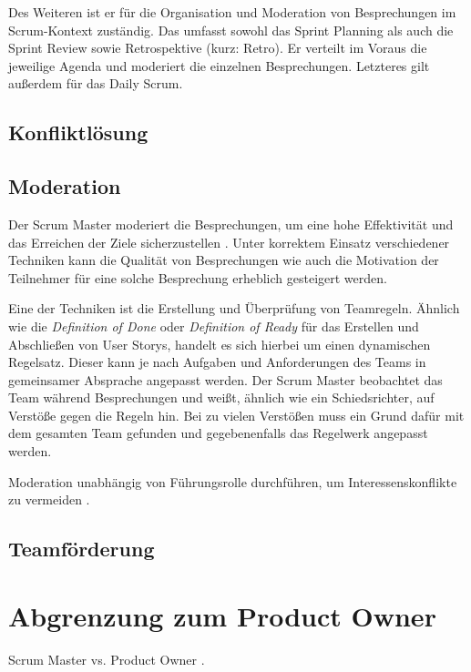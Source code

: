 \documentclass[5pt, final]{beamer}
\begin{document}
\begin{frame}[t]
\begin{multicols}{3}
			Des Weiteren ist er für die Organisation und Moderation von Besprechungen im Scrum-Kontext zuständig.
			Das umfasst sowohl das Sprint Planning als auch die Sprint Review sowie Retrospektive (kurz: Retro).
			Er verteilt im Voraus die jeweilige Agenda und moderiert die einzelnen Besprechungen.
			Letzteres gilt außerdem für das Daily Scrum.
			
			\subsection{Konfliktlösung}
			
			\subsection{Moderation}
			
			Der Scrum Master moderiert die Besprechungen, um eine hohe Effektivität und das Erreichen der Ziele sicherzustellen \cite{vantighem24}.
			Unter korrektem Einsatz verschiedener Techniken kann die Qualität von Besprechungen wie auch die Motivation der Teilnehmer für eine solche Besprechung erheblich gesteigert werden.
			
			Eine der Techniken ist die Erstellung und Überprüfung von Teamregeln.
			Ähnlich wie die \textit{Definition of Done} oder \textit{Definition of Ready} für das Erstellen und Abschließen von User Storys, handelt es sich hierbei um einen dynamischen Regelsatz.
			Dieser kann je nach Aufgaben und Anforderungen des Teams in gemeinsamer Absprache angepasst werden.
			Der Scrum Master beobachtet das Team während Besprechungen und weißt, ähnlich wie ein Schiedsrichter, auf Verstöße gegen die Regeln hin.
			Bei zu vielen Verstößen muss ein Grund dafür mit dem gesamten Team gefunden und gegebenenfalls das Regelwerk angepasst werden.
			
			Moderation unabhängig von Führungsrolle durchführen, um Interessenskonflikte zu vermeiden \cite[S. 23]{malten24}.
			
			\subsection{Teamförderung}
			
			\section{Abgrenzung zum Product Owner}
			
			Scrum Master vs. Product Owner \cite{me-company}.
			

\end{multicols}
\end{frame}
\end{document}
